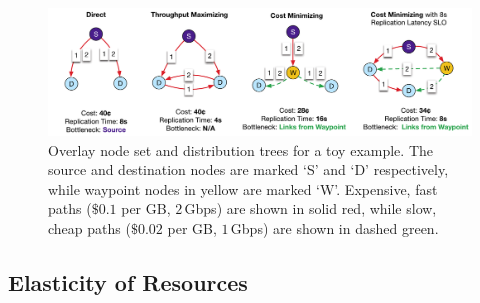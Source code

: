 \begin{figure}[tbp]
    \centering
    \includegraphics[width=0.9\linewidth]{figures/toy_example.pdf}
    \caption{Overlay node set and distribution trees for a toy example.  The source and destination nodes are marked `S' and `D' respectively, while waypoint nodes in yellow are marked `W'. Expensive, fast paths ($\$0.1$ per GB, $2$\,Gbps) are shown in solid red, while slow, cheap paths ($\$0.02$ per GB, $1$\,Gbps) are shown in dashed green. 
    } 
    \label{fig:toy_example}
\end{figure}
\subsection{Elasticity of Resources}

